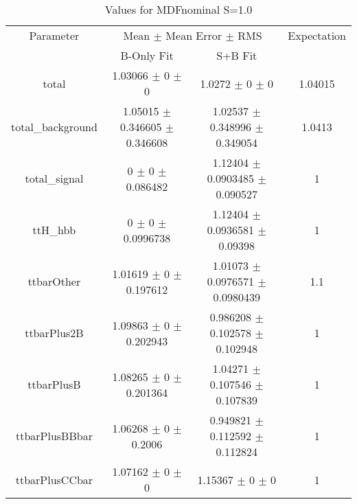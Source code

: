 \begin{table}
\centering
\caption{Values for MDFnominal S=1.0}
\begin{tabular}{cccc}
\toprule
Parameter & \multicolumn{2}{c}{Mean $\pm$ Mean Error $\pm$ RMS} & Expectation\\
 & B-Only Fit & S+B Fit & \\
\midrule
total & \num{1.03066} $\pm$ \num{0} $\pm$ \num{0} & \num{1.0272} $\pm$ \num{0} $\pm$ \num{0} & \num{1.04015}\\
total\_background & \num{1.05015} $\pm$ \num{0.346605} $\pm$ \num{0.346608} & \num{1.02537} $\pm$ \num{0.348996} $\pm$ \num{0.349054} & \num{1.0413}\\
total\_signal & \num{0} $\pm$ \num{0} $\pm$ \num{0.086482} & \num{1.12404} $\pm$ \num{0.0903485} $\pm$ \num{0.090527} & \num{1}\\
ttH\_hbb & \num{0} $\pm$ \num{0} $\pm$ \num{0.0996738} & \num{1.12404} $\pm$ \num{0.0936581} $\pm$ \num{0.09398} & \num{1}\\
ttbarOther & \num{1.01619} $\pm$ \num{0} $\pm$ \num{0.197612} & \num{1.01073} $\pm$ \num{0.0976571} $\pm$ \num{0.0980439} & \num{1.1}\\
ttbarPlus2B & \num{1.09863} $\pm$ \num{0} $\pm$ \num{0.202943} & \num{0.986208} $\pm$ \num{0.102578} $\pm$ \num{0.102948} & \num{1}\\
ttbarPlusB & \num{1.08265} $\pm$ \num{0} $\pm$ \num{0.201364} & \num{1.04271} $\pm$ \num{0.107546} $\pm$ \num{0.107839} & \num{1}\\
ttbarPlusBBbar & \num{1.06268} $\pm$ \num{0} $\pm$ \num{0.2006} & \num{0.949821} $\pm$ \num{0.112592} $\pm$ \num{0.112824} & \num{1}\\
ttbarPlusCCbar & \num{1.07162} $\pm$ \num{0} $\pm$ \num{0} & \num{1.15367} $\pm$ \num{0} $\pm$ \num{0} & \num{1}\\
\bottomrule
\end{tabular}
\end{table}